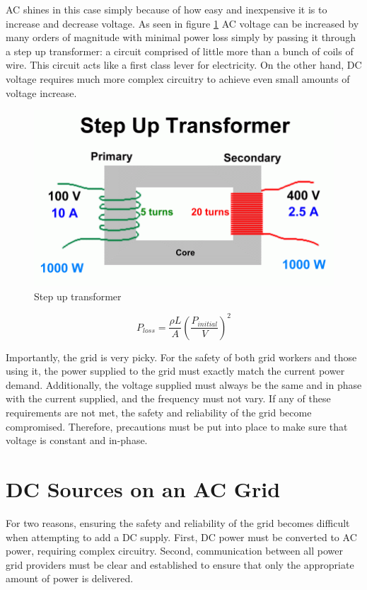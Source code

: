 \documentclass[journal]{IEEEtran}
\begin{document}
	AC shines in this case simply because of how easy and inexpensive it is to increase and decrease voltage. As seen in figure \ref{fig:transformer} AC voltage can be increased by many orders of magnitude with minimal power loss simply by passing it through a step up transformer: a circuit comprised of little more than a bunch of coils of wire. This circuit acts like a first class lever for electricity. On the other hand, DC voltage requires much more complex circuitry to achieve even small amounts of voltage increase. 
	\begin{figure}[h]
		\centering
		\includegraphics[scale=0.4]{step-up-transformer.png}
		\caption{Step up transformer \citep{Transformer}}
		\label{fig:transformer}
	\end{figure}
	
	\begin{equation}
		\label{eq:pwrLoss}
		P_{loss} = \frac{\rho L}{A} \left( \frac{P_{initial}}{V} \right) ^2
	\end{equation}

	Importantly, the grid is very picky. For the safety of both grid workers and those using it, the power supplied to the grid must exactly match the current power demand. Additionally, the voltage supplied must always be the same and in phase with the current supplied, and the frequency must not vary. If any of these requirements are not met, the safety and reliability of the grid become compromised. Therefore, precautions must be put into place to make sure that voltage is constant and in-phase.
	
	\section{DC Sources on an AC Grid}
	For two reasons, ensuring the safety and reliability of the grid becomes difficult when attempting to add a DC supply. First, DC power must be converted to AC power, requiring complex circuitry. Second, communication between all power grid providers must be clear and established to ensure that only the appropriate amount of power is delivered. 
	
\end{document}
